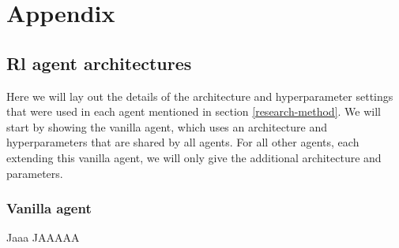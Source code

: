 \chapter{Appendix}\label{appendix}
\section{Rl agent architectures}\label{appendix-agents}
Here we will lay out the details of the architecture and hyperparameter settings that were used in each agent mentioned in section \ref{research-method}. We will start by showing the vanilla agent, which uses an architecture and hyperparameters that are shared by all agents. For all other agents, each extending this vanilla agent, we will only give the additional architecture and parameters.

\subsection{Vanilla agent}
Jaaa JAAAAA
